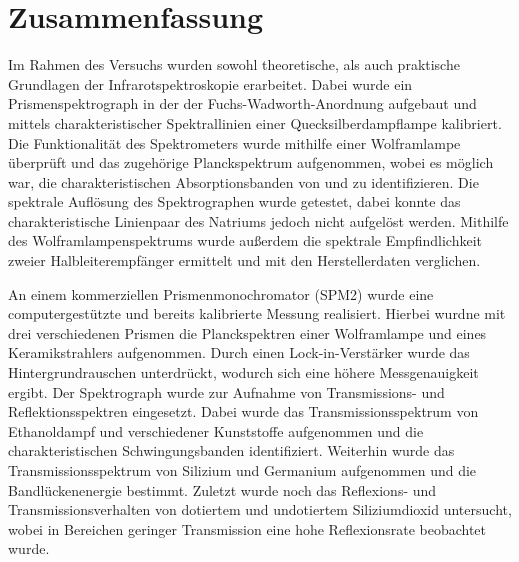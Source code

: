 \documentclass[a4paper,twoside,final]{article}
\begin{document}
\section{Zusammenfassung}
Im Rahmen des Versuchs wurden sowohl theoretische, als auch praktische Grundlagen der Infrarotspektroskopie erarbeitet. Dabei wurde ein Prismenspektrograph in der der Fuchs-Wadworth-Anordnung aufgebaut und mittels charakteristischer Spektrallinien einer Quecksilberdampflampe kalibriert. Die Funktionalität des Spektrometers wurde mithilfe einer Wolframlampe überprüft und das zugehörige Planckspektrum aufgenommen, wobei es möglich war, die charakteristischen Absorptionsbanden von  und  zu identifizieren. Die spektrale Auflösung des Spektrographen wurde getestet, dabei konnte das charakteristische Linienpaar des Natriums jedoch nicht aufgelöst werden. Mithilfe des Wolframlampenspektrums wurde außerdem die spektrale Empfindlichkeit zweier Halbleiterempfänger ermittelt und mit den Herstellerdaten verglichen.

An einem kommerziellen Prismenmonochromator (SPM2) wurde eine computergestützte und bereits kalibrierte Messung realisiert. Hierbei wurdne mit drei verschiedenen Prismen die Planckspektren einer Wolframlampe und eines Keramikstrahlers aufgenommen. Durch einen Lock-in-Verstärker wurde das Hintergrundrauschen unterdrückt, wodurch sich eine höhere Messgenauigkeit ergibt. Der Spektrograph wurde zur Aufnahme von Transmissions- und Reflektionsspektren eingesetzt. Dabei wurde das Transmissionsspektrum von Ethanoldampf und verschiedener Kunststoffe aufgenommen und die charakteristischen Schwingungsbanden identifiziert. Weiterhin wurde das Transmissionsspektrum von Silizium und Germanium aufgenommen und die Bandlückenenergie bestimmt. Zuletzt wurde noch das Reflexions- und Transmissionsverhalten von dotiertem und undotiertem Siliziumdioxid untersucht, wobei in Bereichen geringer Transmission eine hohe Reflexionsrate beobachtet wurde.

{}

\end{document}
